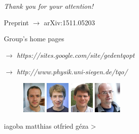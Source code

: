 \documentclass{beamer}
\begin{document}
\section*{}
	\begin{frame}
		\emph{\LARGE Thank you for your attention!}

		\vspace{15px}
		Preprint $\rightarrow$ arXiv:1511.05203

		\vspace{10px}
		Group's home pages

		\hspace{15px} $\rightarrow$ \emph{\color{blue} https://sites.google.com/site/gedentqopt}

		\hspace{15px} $\rightarrow$ \emph{\color{blue} http://www.physik.uni-siegen.de/tqo/}
		\vspace{10px}

		\begin{figure}
			\includegraphics[height=60px]{img/authors/iagoba.jpg}
			\hspace{10px}
			\includegraphics[height=60px]{img/authors/matthias.jpg}
			\hspace{10px}
			\includegraphics[height=60px]{img/authors/otfried.jpg}
			\hspace{10px}
			\includegraphics[height=60px]{img/authors/geza.jpg}
		\end{figure}
		\vspace{-25px}

		\begin{center}
			iagoba \hspace{16px}
			matthias \hspace{16px}
			otfried \hspace{30px}
			g\'eza {\color{white}>}
		\end{center}
	\end{frame}
\end{document}
